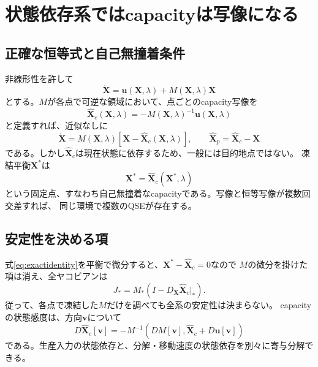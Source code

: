 \documentclass[a4paper,11pt]{ltjsarticle}
\begin{document}
\section{状態依存系ではcapacityは写像になる}
\subsection{正確な恒等式と自己無撞着条件}
非線形性を許して
\begin{equation}
 \dot{\bm X}=\bm u(\bm X,\lambda)+M(\bm X,\lambda)\bm X
 \label{eq:nonlinear}
\end{equation}
とする。$M$が各点で可逆な領域において、点ごとのcapacity写像を
\begin{equation}
 \widehat{\bm X}_c(\bm X,\lambda)
 =-M(\bm X,\lambda)^{-1}\bm u(\bm X,\lambda)
 \label{eq:capacitymap}
\end{equation}
と定義すれば、近似なしに
\begin{equation}
 \dot{\bm X}=M(\bm X,\lambda)
 [\bm X-\widehat{\bm X}_c(\bm X,\lambda)],\qquad
 \widehat{\bm X}_p=\widehat{\bm X}_c-\bm X
 \label{eq:exactidentity}
\end{equation}
である。しかし$\widehat{\bm X}_c$は現在状態に依存するため、一般には目的地点ではない。
凍結平衡$\bm X^*$は
\begin{equation}
 \boxed{\bm X^*=\widehat{\bm X}_c(\bm X^*,\lambda)}
 \label{eq:selfconsistent}
\end{equation}
という固定点、すなわち自己無撞着なcapacityである。写像と恒等写像が複数回交差すれば、
同じ環境で複数のQSEが存在する。

\subsection{安定性を決める項}
式\eqref{eq:exactidentity}を平衡で微分すると、$\bm X^*-\widehat{\bm X}_c=0$なので
$M$の微分を掛けた項は消え、全ヤコビアンは
\begin{equation}
 \boxed{J_*=M_*\left(I-D_{\bm X}\widehat{\bm X}_c\big|_*\right)}.
 \label{eq:jacobian}
\end{equation}
従って、各点で凍結した$M$だけを調べても全系の安定性は決まらない。
capacityの状態感度は、方向$\bm v$について
\begin{equation}
 D\widehat{\bm X}_c[\bm v]
 =-M^{-1}\left(DM[\bm v],\widehat{\bm X}_c+D\bm u[\bm v]\right)
 \label{eq:capacityderivative}
\end{equation}
である。生産入力の状態依存と、分解・移動速度の状態依存を別々に寄与分解できる。
\end{document}
